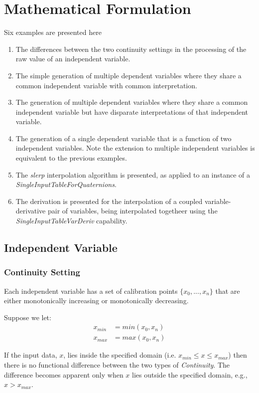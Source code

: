 \documentclass[11pt,fleqn]{report}
\begin{document}
\section{Mathematical Formulation}
Six examples are presented here
\begin{enumerate}
 \item The differences between the two continuity settings in the processing
       of the raw value of an independent variable.
 \item The simple generation of multiple dependent variables where they
 share a common independent variable with common interpretation.
 \item The generation of multiple dependent variables where they
 share a common independent variable but have
 disparate interpretations of that independent variable.
\item The generation of a single dependent variable that is a function of two
independent variables.  Note the extension to multiple independent variables
is equivalent to the previous examples.
\item  The \textit{slerp} interpolation algorithm is presented, as applied to
an instance of a \textit{SingleInputTableForQuaternions}.
\item The derivation is presented for the interpolation of a coupled
variable-derivative pair of variables, being interpolated togetheer using
the \textit{SingleInputTableVarDeriv} capability.
\end{enumerate}

\subsection{Independent Variable}
\label{sec:tab_ind_var}
\subsubsection{Continuity Setting}
 Each independent variable has a set of calibration points
 $\{x_0,...,x_n\}$ that are
 either monotonically increasing or monotonically decreasing.

 Suppose we let:
 \begin{align*}
  x_{min} &= min( x_0, x_n ) \\
  x_{max} &= max( x_0, x_n )
 \end{align*}

 If the input data, $x$, lies inside the specified domain
 (i.e. $x_{min} \leq x \le x_{max}$) then there is no functional
 difference between the two types of \textit{Continuity}.
 The difference becomes apparent only when $x$ lies outside the specified
 domain, e.g., $x > x_{max}$.
\end{document}
